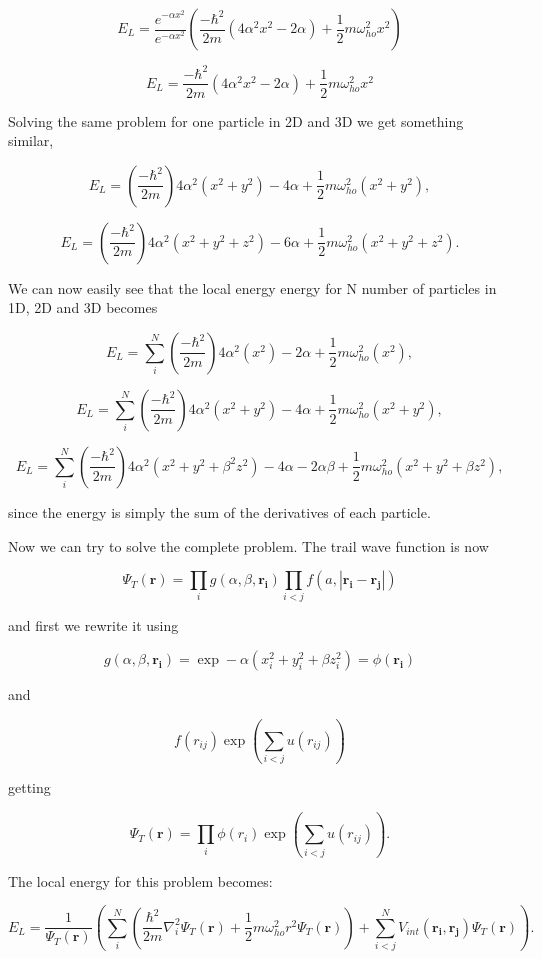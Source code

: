 $$E_L = \frac{e^{-\alpha x^2}}{e^{-\alpha x^2}}\left( \frac{-\hbar^2}{2m}  (4\alpha^2 x^2 - 2\alpha) + \frac{1}{2} m\omega_{ho}^2 x^2\right)$$

$$E_L = \frac{-\hbar^2}{2m}(4\alpha^2 x^2 - 2\alpha) + \frac{1}{2} m\omega_{ho}^2 x^2$$

Solving the same problem for one particle in 2D and 3D we get something similar, 

$$E_L = (\frac{-\hbar^2}{2m})4\alpha^2 (x^2 + y^2) - 4\alpha + \frac{1}{2} m\omega_{ho}^2 (x^2 + y^2),$$

$$E_L = (\frac{-\hbar^2}{2m})4\alpha^2 (x^2 + y^2 + z^2) - 6\alpha + \frac{1}{2} m\omega_{ho}^2 (x^2 + y^2 + z^2).$$

We can now easily see that the local energy energy for N number of particles in 1D, 2D and 3D becomes

$$E_L = \sum_i^N (\frac{-\hbar^2}{2m})4\alpha^2 (x^2) - 2\alpha + \frac{1}{2} m\omega_{ho}^2 (x^2),$$

$$E_L = \sum_i^N (\frac{-\hbar^2}{2m})4\alpha^2 (x^2 + y^2) - 4\alpha + \frac{1}{2} m\omega_{ho}^2 (x^2 + y^2),$$

$$E_L = \sum_i^N (\frac{-\hbar^2}{2m})4\alpha^2 (x^2 + y^2 + \beta^2 z^2) - 4\alpha -2\alpha \beta + \frac{1}{2} m\omega_{ho}^2 (x^2 + y^2 + \beta z^2),$$

since the energy is simply the sum of the derivatives of each particle.

Now we can try to solve the complete problem. The trail wave function is now

$$\Psi_T(\mathbf{r}) = \prod_{i} g(\alpha, \beta, \mathbf{r_i}) \prod_{i<j} f(a, |\mathbf{r_i} - \mathbf{r_j}|)$$

and first we rewrite it using 

$$g(\alpha, \beta, \mathbf{r_i}) = \exp -\alpha (x_i^2 + y_i^2 + \beta z_i^2) = \phi (\mathbf{r_i})$$

and 

$$f(r_{ij})\exp \left(\sum_{i<j}u(r_{ij})\right)$$

getting 

$$\Psi_T(\mathbf{r}) = \prod_{i} \phi (r_i) \exp \left(\sum_{i<j}u(r_{ij})\right).$$

The local energy for this problem becomes:


\begin{equation} \label{eq:local energy}
E_L = \frac{1}{\Psi_T(\boldsymbol{r})} \left( \sum_{i}^{N} \left(\frac{\hbar^2}{2m} \nabla_i^2 \Psi_T(\mathbf{r}) + \frac{1}{2} m\omega_{ho}^2 r^2 \Psi_T(\mathbf{r}) \right) + \sum_{i<j}^{N} V_{int}(\mathbf{r_i},\mathbf{r_j}) \Psi_T(\mathbf{r}) \right).
\end{equation}


